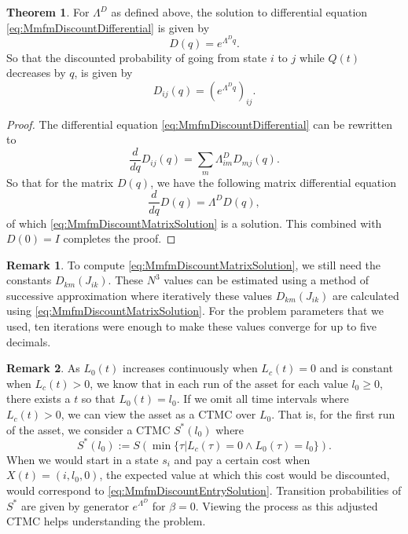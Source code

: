 \documentclass[a4paper]{thesis}
\theoremstyle{definition}
\newtheorem{remark}{Remark}[chapter]
\newtheorem{theorem}{Theorem}[chapter]
\begin{document}
\begin{theorem}
	For $\Lambda^D$ as defined above, the solution to differential equation \eqref{eq:MmfmDiscountDifferential} is given by
	\begin{equation}\label{eq:MmfmDiscountMatrixSolution}
	D(q)=e^{\Lambda^D q}.
	\end{equation}
	So that the discounted probability of going from state $i$ to $j$ while $Q(t)$ decreases by $q$, is given by
	\begin{equation}\label{eq:MmfmDiscountEntrySolution}
	D_{ij}(q)=\left(e^{\Lambda^D q}\right)_{ij}.
	\end{equation}
	\begin{proof}
		The differential equation \eqref{eq:MmfmDiscountDifferential} can be rewritten to
		\[
			\frac{d}{dq}D_{ij}(q)=\sum\limits_m\Lambda^D_{im}D_{mj}(q).
		\]
		So that for the matrix $D(q)$, we have the following matrix differential equation
		\[
		\frac{d}{dq}D(q)=\Lambda^D D(q),
		\]
		of which \eqref{eq:MmfmDiscountMatrixSolution} is a solution.
		This combined with $D(0)=I$ completes the proof.
	\end{proof}
\end{theorem}

\begin{remark}
	To compute \eqref{eq:MmfmDiscountMatrixSolution}, we still need the constants $D_{km}(J_{ik})$.
	These $N^3$ values can be estimated using a method of successive approximation where iteratively these values $D_{km}(J_{ik})$ are calculated using \eqref{eq:MmfmDiscountMatrixSolution}.
	For the problem parameters that we used, ten iterations were enough to make these values converge for up to five decimals.
\end{remark}

\begin{remark}\label{remark:MmfmStochasticShortestPath}
	As $L_0(t)$ increases continuously when $L_c(t)=0$ and is constant when $L_c(t)>0$, we know that in each run of the asset for each value $l_0\geq0$, there exists a $t$ so that $L_0(t)=l_0$.
	If we omit all time intervals where $L_c(t)>0$, we can view the asset as a CTMC over $L_0$.
	That is, for the first run of the asset, we consider a CTMC $S^*(l_0)$ where
	\[
	S^*(l_0):=S(\min\{\tau|L_c(\tau)=0\wedge L_0(\tau)=l_0\}).
	\]
	When we would start in a state $s_i$ and pay a certain cost when $X(t)=(i,l_0,0)$, the expected value at which this cost would be discounted, would correspond to \eqref{eq:MmfmDiscountEntrySolution}.
	Transition probabilities of $S^*$ are given by generator $e^{\Lambda^D}$ for $\beta=0$.
	Viewing the process as this adjusted CTMC helps understanding the problem.
\end{remark}
\end{document}
